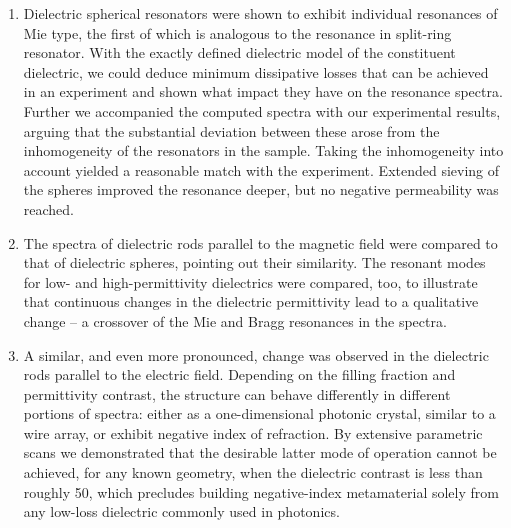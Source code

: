 \begin{enumerate}
{} 
\item{Dielectric spherical resonators were shown to exhibit individual resonances of Mie type, the first of which is analogous to the resonance in split-ring resonator. With the exactly defined dielectric model of the constituent dielectric, we could deduce minimum dissipative losses that can be achieved in an experiment and shown what impact they have on the resonance spectra. Further we accompanied the computed spectra with our experimental results, arguing that the substantial deviation between these arose from the inhomogeneity of the resonators in the sample. Taking the inhomogeneity into account yielded a reasonable match with the experiment. Extended sieving of the spheres improved the resonance deeper, but no negative permeability was reached.
} 
\item{The spectra of dielectric rods parallel to the magnetic field were compared to that of dielectric spheres, pointing out their similarity. The resonant modes for low- and high-permittivity dielectrics were compared, too, to illustrate that continuous changes in the dielectric permittivity lead to a qualitative change -- a crossover of the Mie and Bragg resonances in the spectra.
} 
\item{A similar, and even more pronounced, change was observed in the dielectric rods parallel to the electric field. Depending on the filling fraction and permittivity contrast, the structure can behave differently in different portions of spectra: either as a one-dimensional photonic crystal, similar to a wire array, or exhibit negative index of refraction. By extensive parametric scans we demonstrated that the desirable latter mode of operation  cannot be achieved, for any known geometry, when the dielectric contrast is less than roughly 50, which precludes building negative-index metamaterial solely from any low-loss dielectric commonly used in photonics. 
}
\end{enumerate}
